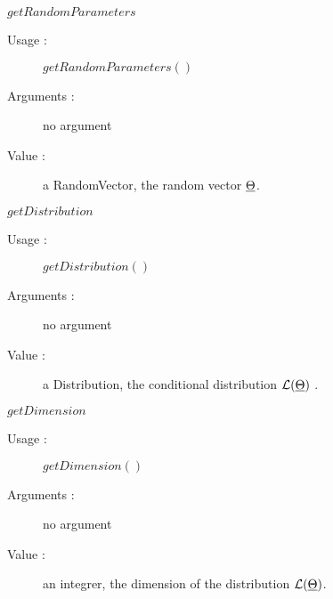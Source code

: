 \begin{description}
\begin{description}
  \item $getRandomParameters$
    \begin{description}
    \item[Usage :] $getRandomParameters()$
    \item[Arguments :] no argument
    \item[Value :] a RandomVector, the random vector ${\underline{\Theta}}$.
    \end{description}
    \bigskip

  \item $getDistribution$
    \begin{description}
    \item[Usage :] $getDistribution()$
    \item[Arguments :] no argument
    \item[Value :] a Distribution, the conditional distribution $\mathcal{L}({\underline{\Theta}})$ .
    \end{description}
    \bigskip

  \item $getDimension$
    \begin{description}
    \item[Usage :] $getDimension()$
    \item[Arguments :] no argument
    \item[Value :] an integrer, the dimension of the distribution $\mathcal{L}({\underline{\Theta}})$.
    \end{description}


    \end{description}
 
\end{description}

